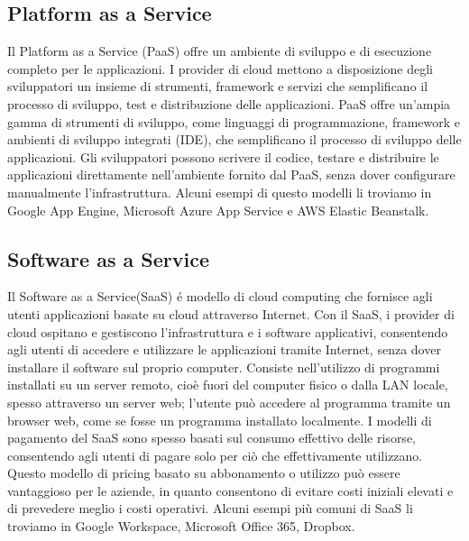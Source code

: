 \documentclass[../main.tex]{subfiles}
\begin{document}
\subsection{Platform as a Service}
Il Platform as a Service (PaaS) offre un ambiente di sviluppo e di esecuzione completo per le applicazioni. I provider di cloud mettono a disposizione degli sviluppatori un insieme di strumenti, framework e servizi che semplificano il processo di sviluppo, test e distribuzione delle applicazioni.
PaaS offre un'ampia gamma di strumenti di sviluppo, come linguaggi di programmazione, framework e ambienti di sviluppo integrati (IDE), che semplificano il processo di sviluppo delle applicazioni. Gli sviluppatori possono scrivere il codice, testare e distribuire le applicazioni direttamente nell'ambiente fornito dal PaaS, senza dover configurare manualmente l'infrastruttura.
Alcuni esempi di questo modelli li troviamo in Google App Engine, Microsoft Azure App Service e AWS Elastic Beanstalk.

\subsection{Software as a Service}
Il Software as a Service(SaaS) é modello di cloud computing che fornisce agli utenti applicazioni basate su cloud attraverso Internet. Con il SaaS, i provider di cloud ospitano e gestiscono l'infrastruttura e i software applicativi, consentendo agli utenti di accedere e utilizzare le applicazioni tramite Internet, senza dover installare il software sul proprio computer.
Consiste nell'utilizzo di programmi installati su un server remoto, cioè fuori del computer fisico o dalla LAN locale, spesso attraverso un server web; l'utente può accedere al programma tramite un browser web, come se fosse un programma installato localmente.
I modelli di pagamento del SaaS sono spesso basati sul consumo effettivo delle risorse, consentendo agli utenti di pagare solo per ciò che effettivamente utilizzano. Questo modello di pricing basato su abbonamento o utilizzo può essere vantaggioso per le aziende, in quanto consentono di evitare costi iniziali elevati e di prevedere meglio i costi operativi.
Alcuni esempi più comuni di SaaS li troviamo in Google Workspace, Microsoft Office 365, Dropbox.
\end{document}
